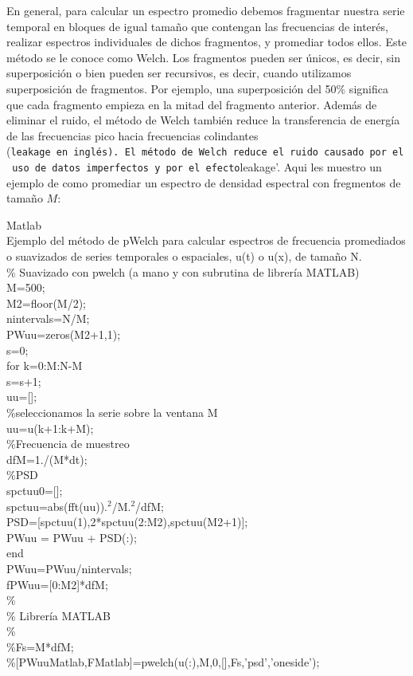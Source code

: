 \documentclass[
]{agujournal2019}
\begin{document}
En general, para calcular un espectro promedio debemos fragmentar
nuestra serie temporal en bloques de igual tamaño que contengan las
frecuencias de interés, realizar espectros individuales de dichos
fragmentos, y promediar todos ellos. Este método se le conoce como
Welch. Los fragmentos pueden ser únicos, es decir, sin superposición o
bien pueden ser recursivos, es decir, cuando utilizamos superposición de
fragmentos. Por ejemplo, una superposición del 50\% significa que cada
fragmento empieza en la mitad del fragmento anterior. Además de eliminar
el ruido, el método de Welch también reduce la transferencia de energía
de las frecuencias pico hacia frecuencias colindantes
(\texttt{leakage\textquotesingle{}\ en\ inglés).\ El\ método\ de\ Welch\ reduce\ el\ ruido\ causado\ por\ el\ uso\ de\ datos\ imperfectos\ y\ por\ el\ efecto}leakage'.
Aqui les muestro un ejemplo de como promediar un espectro de densidad
espectral con fregmentos de tamaño \(M\):

\begin{framed}
{\textbf \noindent Matlab} \\
Ejemplo del método de pWelch para calcular espectros
de frecuencia promediados o suavizados de series temporales
o espaciales, u(t) o u(x), de tamaño N.
\\
\% Suavizado con pwelch (a mano y con
subrutina de librería MATLAB)\\
M=500;\\
M2=floor(M/2);\\
nintervals=N/M;\\
PWuu=zeros(M2+1,1);\\
s=0;\\
for k=0:M:N-M\\
      s=s+1;\\
      uu=[];\\

      \%seleccionamos la serie sobre la ventana M\\
      uu=u(k+1:k+M);\\

      \%Frecuencia de muestreo\\
      dfM=1./(M*dt);\\

      \%PSD\\
      spctuu0=[];\\
      spctuu=abs(fft(uu)).$^2$/M.$^2$/dfM;\\
      PSD=[spctuu(1),2*spctuu(2:M2),spctuu(M2+1)];\\

      PWuu = PWuu + PSD(:);\\
end\\

PWuu=PWuu/nintervals;\\
fPWuu=[0:M2]*dfM;\\

\%\\
\% Librería MATLAB\\
\%\\
\%Fs=M*dfM;\\
\%[PWuuMatlab,FMatlab]=pwelch(u(:),M,0,[],Fs,'psd','oneside');

\end{framed}
\end{document}
